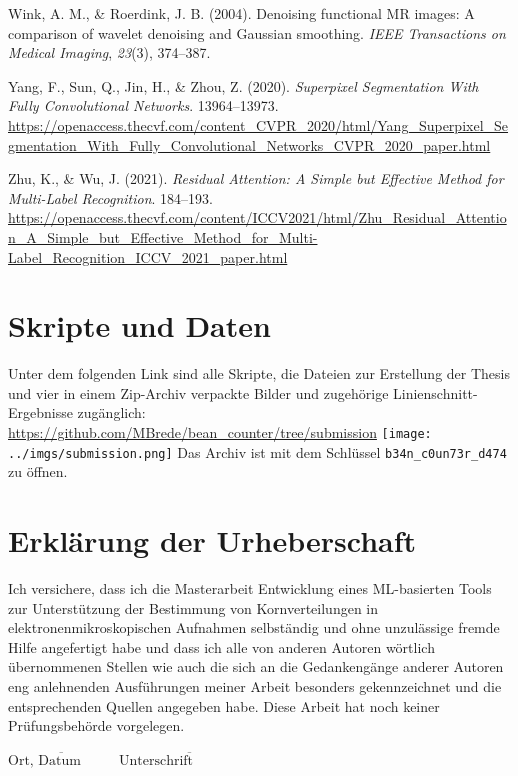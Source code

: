 \documentclass[
  12pt,
  openany]{book}
\newlength{\cslhangindent}
\newlength{\cslentryspacingunit} %
\newenvironment{CSLReferences}[2] %
 {%
  \setlength{\parindent}{0pt}
  \ifodd #1
  \let\oldpar\par
  \def\par{\hangindent=\cslhangindent\oldpar}
  \fi
  \setlength{\parskip}{#2\cslentryspacingunit}
 }%
 {}
\begin{document}
\begin{CSLReferences}{1}{0}
\leavevmode{}%
Wink, A. M., \& Roerdink, J. B. (2004). Denoising functional {MR} images: A comparison of wavelet denoising and {Gaussian} smoothing. \emph{IEEE Transactions on Medical Imaging}, \emph{23}(3), 374--387.

\leavevmode{}%
Yang, F., Sun, Q., Jin, H., \& Zhou, Z. (2020). \emph{Superpixel {Segmentation With Fully Convolutional Networks}}. 13964--13973. \url{https://openaccess.thecvf.com/content_CVPR_2020/html/Yang_Superpixel_Segmentation_With_Fully_Convolutional_Networks_CVPR_2020_paper.html}

\leavevmode{}%
Zhu, K., \& Wu, J. (2021). \emph{Residual {Attention}: {A Simple} but {Effective Method} for {Multi-Label Recognition}}. 184--193. \url{https://openaccess.thecvf.com/content/ICCV2021/html/Zhu_Residual_Attention_A_Simple_but_Effective_Method_for_Multi-Label_Recognition_ICCV_2021_paper.html}

\end{CSLReferences}

\chapter*{Skripte und Daten}

Unter dem folgenden Link sind alle Skripte, die Dateien zur Erstellung der Thesis und vier in einem Zip-Archiv verpackte Bilder und zugehörige Linienschnitt-Ergebnisse zugänglich: \newline
\href{https://github.com/MBrede/bean_counter/tree/submission}{https://github.com/MBrede/bean\_counter/tree/submission}\newline
\texttt{[image: ../imgs/submission.png]}\newline
Das Archiv ist mit dem Schlüssel \texttt{b34n\_c0un73r\_d474} zu öffnen.



\chapter*{Erklärung der Urheberschaft}

Ich versichere, dass ich die Masterarbeit \glqq{}Entwicklung eines ML-basierten Tools zur Unterstützung der Bestimmung von Kornverteilungen in elektronenmikroskopischen Aufnahmen\grqq{} selbständig und ohne
unzulässige fremde Hilfe angefertigt habe und dass ich alle von anderen Autoren wörtlich
übernommenen Stellen wie auch die sich an die Gedankengänge anderer Autoren eng
anlehnenden Ausführungen meiner Arbeit besonders gekennzeichnet und die
entsprechenden Quellen angegeben habe.
Diese Arbeit hat noch keiner Prüfungsbehörde vorgelegen.

\vspace{4cm}

\hspace{1cm} $\overline{\text{Ort, Datum} \hspace{1cm}}$ \hspace{3cm} $\overline{\text{Unterschrift} \hspace{2cm}}$
\end{document}
